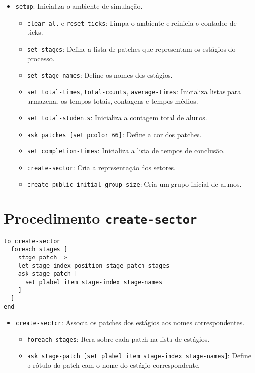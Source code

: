 \documentclass{article}
\begin{document}
\begin{itemize}
    \item \texttt{setup}: Inicializa o ambiente de simulação.
    \begin{itemize}
        \item \texttt{clear-all} e \texttt{reset-ticks}: Limpa o ambiente e reinicia o contador de ticks.
        \item \texttt{set stages}: Define a lista de patches que representam os estágios do processo.
        \item \texttt{set stage-names}: Define os nomes dos estágios.
        \item \texttt{set total-times}, \texttt{total-counts}, \texttt{average-times}: Inicializa listas para armazenar os tempos totais, contagens e tempos médios.
        \item \texttt{set total-students}: Inicializa a contagem total de alunos.
        \item \texttt{ask patches [set pcolor 66]}: Define a cor dos patches.
        \item \texttt{set completion-times}: Inicializa a lista de tempos de conclusão.
        \item \texttt{create-sector}: Cria a representação dos setores.
        \item \texttt{create-public initial-group-size}: Cria um grupo inicial de alunos.
    \end{itemize}
\end{itemize}

\section{Procedimento \texttt{create-sector}}

\begin{lstlisting}[language=NetLogo]
to create-sector
  foreach stages [
    stage-patch ->
    let stage-index position stage-patch stages
    ask stage-patch [
      set plabel item stage-index stage-names
    ]
  ]
end
\end{lstlisting}

\begin{itemize}
    \item \texttt{create-sector}: Associa os patches dos estágios aos nomes correspondentes.
    \begin{itemize}
        \item \texttt{foreach stages}: Itera sobre cada patch na lista de estágios.
        \item \texttt{ask stage-patch [set plabel item stage-index stage-names]}: Define o rótulo do patch com o nome do estágio correspondente.
    \end{itemize}
\end{itemize}
\end{document}
